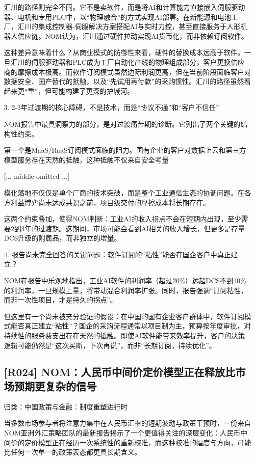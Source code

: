 \documentclass[11pt]{ctexart}
\begin{document}
汇川的路径则完全不同。它不是卖软件，而是将AI和计算能力直接嵌入伺服驱动器、电机和专用PLC中，以“物理融合”的方式实现AI部署。在新能源和电池工厂，汇川的集成控制器-伺服解决方案搭配AI与实时力控，甚至直接服务于人形机器人供应链。NOM认为，汇川通过硬件拉动实现AI货币化，而非依赖订阅软件。

这种差异意味着什么？从商业模式的防御性来看，硬件的替换成本远高于软件。一旦汇川的伺服驱动器和PLC成为工厂自动化产线的物理组成部分，客户更换供应商的摩擦成本极高。而软件订阅模式虽然边际利润更高，但在当前阶段面临客户对数据安全、国产替代的抵触，以及“先试用再付款”的采购惯性。汇川的路径虽然看起来更“重”，但可能构建了更深的护城河。

3. 2-3年过渡期的核心障碍，不是技术，而是“协议不通”和“客户不信任”

NOM报告中最具洞察力的部分，是对过渡痛苦期的诊断。它列出了两个关键的结构性约束。

第一个是MaaS/RaaS订阅模式面临的阻力。国有企业的客户对数据上云和第三方模型服务存在天然的抵触，这种抵触不仅来自安全考量

[... middle omitted ...]

模化落地不仅仅是单个厂商的技术突破，而是整个工业通信生态的协调问题。在各方利益博弈尚未达成共识之前，项目级交付的摩擦成本将长期存在。

这两个约束叠加，使得NOM判断：工业AI的收入拐点不会在短期内出现，至少需要2到3年的过渡期。这期间，市场可能会看到AI相关的收入增长，但更多是存量DCS升级的附属品，而非独立的增量。

4. 报告尚未完全回答的关键问题：软件订阅的“粘性”能否在国企客户中真正建立？

NOM在报告中乐观地指出，工业AI软件的利润率（超过20\%）远超DCS不到10\%的利润率，一旦规模上量，将带动混合利润率扩张。同时，报告强调“订阅粘性，而非一次性项目，才是持久的拐点”。

但这里有一个尚未被充分验证的假设：在中国的国有企业客户群体中，软件订阅模式能否真正建立“粘性”？国企的采购流程通常以项目制为主，预算按年度审批，对持续性的服务费支出存在天然的抵触。即使AI软件能带来效率提升，客户的决策逻辑可能仍然是“这次买断，下次再说”，而非“长期订阅，持续优化”。

\subsection{[R024] NOM：人民币中间价定价模型正在释放比市场预期更复杂的信号}
{\small\color{refgray}归类：中国政策与金融：制度重塑进行时}

当多数市场参与者将注意力集中在人民币汇率的短期波动与政策干预时，一份来自NOM亚洲外汇策略团队的最新报告揭示了一个更值得关注的深层变化：人民币中间价的定价模型正在经历一次系统性的重新校准，而这种校准的幅度与方向，可能比任何一次单一的政策表态都更具长期含义。
\end{document}
